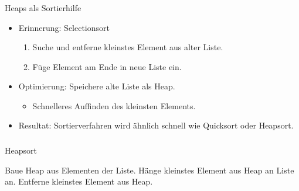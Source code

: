 \begin{frame}
\frametitle{\insertsection}
\begin{block}
{Heaps als Sortierhilfe}
\begin{itemize}
	\item Erinnerung: Selectionsort
	\begin{enumerate}
		\item Suche und entferne kleinstes Element aus alter Liste.
		\item Füge Element am Ende in neue Liste ein.
	\end{enumerate}
	\item Optimierung: Speichere alte Liste als Heap.
	\begin{itemize}
		\item[\positive] Schnelleres Auffinden des kleinsten Elements.
	\end{itemize}
	\item Resultat: Sortierverfahren wird ähnlich schnell wie Quicksort oder Heapsort.
\end{itemize}
\end{block}
\end{frame}

\begin{frame}
\frametitle{\insertsection}
\begin{block}
{Heapsort}
\begin{algorithmic}
	\State Baue Heap aus Elementen der Liste.
		\State Hänge kleinstes Element aus Heap an Liste an.
		\State Entferne kleinstes Element aus Heap.
	\EndWhile
\end{algorithmic}
\end{block}
\end{frame}

\endinput

\begin{frame}
\frametitle{\insertsection}
\begin{block}
{}
\end{block}
\end{frame}
